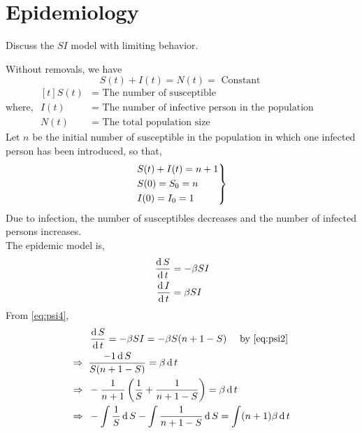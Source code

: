 \documentclass[../main-sheet.tex]{subfiles}
\begin{document}
\section{Epidemiology}
\begin{prob}
    Discuss the \(SI\) model with limiting behavior.
\end{prob}
\begin{soln}
    Without removals, we have\
    \begin{equation}
        S(t)+I(t)=N(t)=\text{ Constant }
        \label{eq:psi1}
    \end{equation}
    where, \(\begin{aligned}[t]
        S(t)&=\text{ The number of susceptible}\\
        I(t)&=\text{ The number of infective person in the population}\\
        N(t)&=\text{ The total population size}
    \end{aligned}\)\\
    Let \(n\) be the initial number of susceptible in the population in which one infected person has been introduced, so that,
    \begin{equation}
        \begin{rcases}
            S(t)+I(t)=n+1\\    
            S(0)=S_0=n\\    
            I(0)=I_0=1    
        \end{rcases}
        \label{eq:psi2}
    \end{equation}
    Due to infection, the number of susceptibles decreases and the number of infected persons increases.\\
    The epidemic model is,
    \begin{align}
        \,\frac{\mathrm{d}\,S}{\mathrm{d}\,t}&=-\beta SI\label{eq:psi3}\\
        \,\frac{\mathrm{d}\,I}{\mathrm{d}\,t}&=\beta SI\label{eq:psi4}
    \end{align}
    From \eqref{eq:psi4},
    \begin{align}
        & \ddt{S}=-\beta SI=-\beta S(n+1-S) \quad\text{ by \eqref{eq:psi2}}\notag\\
        \Rightarrow\;\;& \frac{-1 \D S}{S(n+1-S)}=\beta \D t\notag\\
        \Rightarrow\;\;& -\frac{1 }{n+1}\left( \frac{1}{S}+\frac{1}{n+1-S} \right)=\beta \D t\notag\\
        \Rightarrow\;\;& -\int \frac{1 }{S}\D S-\int \frac{1}{n+1-S} \D S=\int(n+1)\beta \D t\notag\\

\end{align}
\end{soln}
\end{document}
